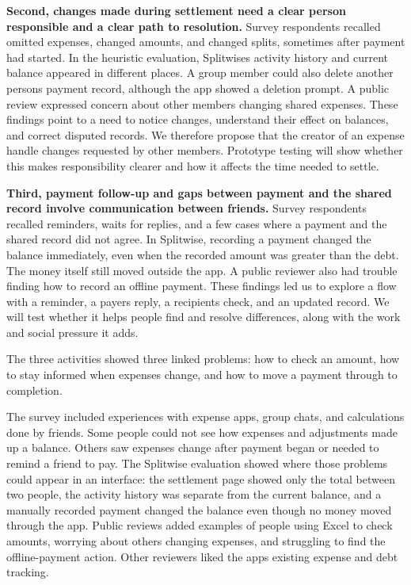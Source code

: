 \documentclass[letterpaper]{jdf}
\begin{document}
\textbf{Second, changes made during settlement need a clear person responsible and a clear path to resolution.} Survey respondents recalled omitted expenses, changed amounts, and changed splits, sometimes after payment had started. In the heuristic evaluation, Splitwise\textquotesingle s activity history and current balance appeared in different places. A group member could also delete another person\textquotesingle s payment record, although the app showed a deletion prompt. A public review expressed concern about other members changing shared expenses. These findings point to a need to notice changes, understand their effect on balances, and correct disputed records. We therefore propose that the creator of an expense handle changes requested by other members. Prototype testing will show whether this makes responsibility clearer and how it affects the time needed to settle.

\textbf{Third, payment follow-up and gaps between payment and the shared record involve communication between friends.} Survey respondents recalled reminders, waits for replies, and a few cases where a payment and the shared record did not agree. In Splitwise, recording a payment changed the balance immediately, even when the recorded amount was greater than the debt. The money itself still moved outside the app. A public reviewer also had trouble finding how to record an offline payment. These findings led us to explore a flow with a reminder, a payer\textquotesingle s reply, a recipient\textquotesingle s check, and an updated record. We will test whether it helps people find and resolve differences, along with the work and social pressure it adds.

The three activities showed three linked problems: how to check an amount, how to stay informed when expenses change, and how to move a payment through to completion.

The survey included experiences with expense apps, group chats, and calculations done by friends. Some people could not see how expenses and adjustments made up a balance. Others saw expenses change after payment began or needed to remind a friend to pay. The Splitwise evaluation showed where those problems could appear in an interface: the settlement page showed only the total between two people, the activity history was separate from the current balance, and a manually recorded payment changed the balance even though no money moved through the app. Public reviews added examples of people using Excel to check amounts, worrying about others changing expenses, and struggling to find the offline-payment action. Other reviewers liked the app\textquotesingle s existing expense and debt tracking.
\end{document}

